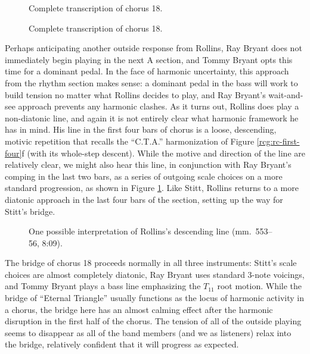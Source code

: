 \begin{figure}[p]
  \renewcommand{\theContinuedFloat}{ (continued)}
  \ContinuedFloat
  \caption[]{Complete transcription of chorus 18.}
\end{figure}

\begin{figure}[tp]
  \renewcommand{\theContinuedFloat}{ (continued)}
  \ContinuedFloat
  \caption[]{Complete transcription of chorus 18.}
\end{figure}

Perhaps anticipating another outside response from Rollins, Ray Bryant does
not immediately begin playing in the next A section, and Tommy Bryant opts
this time for a dominant pedal. In the face of harmonic uncertainty, this
approach from the rhythm section makes sense: a dominant pedal in the bass
will work to build tension no matter what Rollins decides to play, and Ray
Bryant's wait-and-see approach prevents any harmonic clashes. As it turns out,
Rollins does play a non-diatonic line, and again it is not entirely clear what
harmonic framework he has in mind. His line in the first four bars of chorus
 is a loose, descending, motivic repetition that recalls the
``C.T.A.'' harmonization of Figure \ref{rcg:rc-first-four}f (with its
whole-step descent). While the motive and direction of the line are relatively
clear, we might also hear this line, in conjunction with Ray Bryant's comping
in the last two bars, as a series of outgoing scale choices on a more standard
progression, as shown in Figure \ref{et:sr-desc-motive}. Like Stitt, Rollins
returns to a more diatonic approach in the last four bars of the section,
setting up the way for Stitt's bridge.

\begin{figure}[tbp]
  \caption[One possible interpretation of Rollins's descending line.]{%
    One possible interpretation of Rollins's descending line (mm.~553--56,
    8:09).}
  \label{et:sr-desc-motive}
\end{figure}

The bridge of chorus 18 proceeds normally in all three instruments: Stitt's
scale choices are almost completely diatonic, Ray Bryant uses standard 3-note
voicings, and Tommy Bryant plays a bass line emphasizing the $T_{11}$ root
motion. While the bridge of ``Eternal Triangle'' usually functions as the
locus of harmonic activity in a chorus, the bridge here has an almost calming
effect after the harmonic disruption in the first half of the chorus. The
tension of all of the outside playing seems to disappear as all of the band
members (and we as listeners) relax into the bridge, relatively confident that
it will progress as expected.

